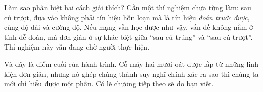 Làm sao phân biệt hai cách giải thích? Cần một thí nghiệm chưa từng làm: sau cú trượt, đưa vào không phải tín hiệu hỗn loạn mà là tín hiệu \emph{đoán trước được}, cùng độ dài và cường độ. Nếu mạng vẫn học được như vậy, vấn đề không nằm ở tính dễ đoán, mà đơn giản ở sự khác biệt giữa ``sau cú trúng'' và ``sau cú trượt''. Thí nghiệm này vẫn đang chờ người thực hiện.

Và đây là điểm cuối của hành trình. Cỗ máy hai mươi oát được lắp từ những linh kiện đơn giản, nhưng nó ghép chúng thành suy nghĩ chính xác ra sao thì chúng ta mới chỉ hiểu được một phần. Có lẽ chương tiếp theo sẽ do bạn viết.

